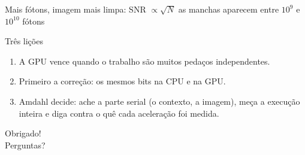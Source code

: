 \documentclass[aspectratio=169,11pt]{beamer}
\begin{document}

\begin{frame}{Mais fótons, imagem mais limpa: SNR $\propto \sqrt{N}$}
  \centering
  \small as manchas aparecem entre $10^9$ e $10^{10}$ fótons
\end{frame}

\begin{frame}{Três lições}
  \begin{enumerate}
    \item A GPU vence quando o trabalho são muitos pedaços independentes.
    \item Primeiro a correção: os mesmos bits na CPU e na GPU.
    \item Amdahl decide: ache a parte serial (o contexto, a imagem), meça a execução inteira e diga contra o quê cada aceleração foi medida.
  \end{enumerate}
\end{frame}

\begin{frame}
  \centering\Large Obrigado!\\[1em]
  \normalsize Perguntas?
\end{frame}
\end{document}
